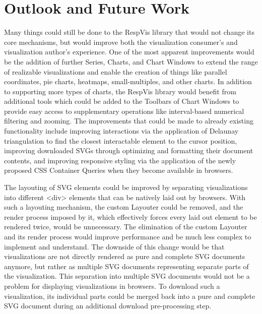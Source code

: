 \chapter{Outlook and Future Work}
\label{chap:Outlook}

Many things could still be done to the RespVis library that would not
change its core mechanisms, but would improve both the visualization
consumer's and visualization author's experience. One of the most
apparent improvements would be the addition of further Series, Charts,
and Chart Windows to extend the range of realizable visualizations and
enable the creation of things like parallel coordinates, pie charts,
heatmaps, small-multiples, and other charts. In addition to supporting
more types of charts, the RespVis library would benefit from
additional tools which could be added to the Toolbars of Chart Windows
to provide easy access to supplementary operations like interval-based
numerical filtering and zooming. The improvements that could be made
to already existing functionality include improving interactions via
the application of Delaunay triangulation
\parencite{Delaunay,DelaunayAlgorithms} to find the closest
interactable element to the cursor position, improving downloaded SVGs
through optimizing and formatting their document contents, and
improving responsive styling via the application of the newly proposed
CSS Container Queries \parencite{CSSContainment3} when they become
available in browsers.

The layouting of SVG elements could be improved by separating
visualizations into different <div> elements that can be natively laid
out by browsers. With such a layouting mechanism, the custom Layouter
could be removed, and the render process imposed by it, which
effectively forces every laid out element to be rendered twice, would
be unnecessary. The elimination of the custom Layouter and its render
process would improve performance and be much less complex to
implement and understand. The downside of this change would be that
visualizations are not directly rendered as pure and complete SVG
documents anymore, but rather as multiple SVG documents representing
separate parts of the visualization. This separation into multiple SVG
documents would not be a problem for displaying visualizations in
browsers. To download such a visualization, its individual parts could
be merged back into a pure and complete SVG document during an
additional download pre-processing step.

